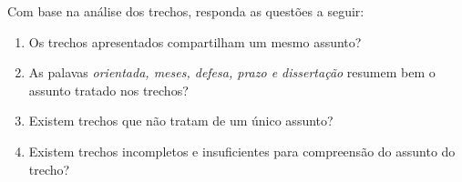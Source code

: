 

\vspace{0.5 cm} 
\noindent Com base na análise dos trechos, responda as questões a seguir:
\vspace{0.5 cm} 


\begin{enumerate}


\item Os trechos apresentados compartilham um mesmo assunto?
\likertB





\item As palavas \textit{orientada, meses, defesa, prazo e dissertação} resumem bem o assunto tratado nos trechos?
\likert





\item Existem trechos que não tratam de um único assunto?
\likertA



\item Existem trechos incompletos e insuficientes para compreensão do assunto do trecho?
\likertA



\end{enumerate}







%
%
%
%
%
















